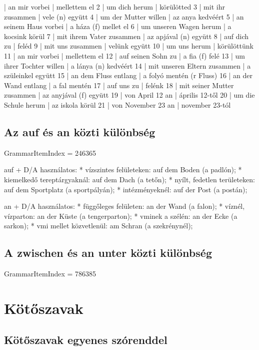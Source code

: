 \documentclass{article}
\newenvironment{desc}{\verbatim}{\endverbatim}
\newenvironment{exmp}{\verbatim}{\endverbatim}
\begin{document}
\begin{exmp}
1 | an mir vorbei | mellettem el
2 | um dich herum | körülötted
3 | mit ihr zusammen | vele (n) együtt
4 | um der Mutter willen | az anya kedvéért
5 | an seinem Haus vorbei | a háza (f) mellet el
6 | um unseren Wagen herum | a kocsink körül
7 | mit ihrem Vater zusammen | az apjával (n) együtt
8 | auf dich zu | feléd
9 | mit uns zusammen | velünk együtt
10 | um uns herum | körülöttünk
11 | an mir vorbei | mellettem el
12 | auf seinen Sohn zu | a fia (f) felé
13 | um ihrer Tochter willen | a lánya (n) kedvéért
14 | mit unseren Eltern zusammen | a szüleinkel együtt
15 | an dem Fluss entlang | a folyó mentén (r Fluss)
16 | an der Wand entlang | a fal mentén
17 | auf uns zu | felénk
18 | mit seiner Mutter zusammen | az anyjával (f) együtt
19 | von April 12 an | április 12-től
20 | um die Schule herum | az iskola körül
21 | von November 23 an | november 23-tól
\end{exmp}

\subsection{Az auf és an közti különbség}

GrammarItemIndex = 246365

\begin{desc}
auf + D/A használatos:
* vízszintes felületeken: auf dem Boden (a padlón);
* kiemelkedő tereptárgyaknál: auf dem Dach (a tetőn);
* nyílt, fedetlen területeken: auf dem Sportplatz (a sportpályán);
* intézményeknél: auf der Post (a postán);

an + D/A használatos:
* függőleges felületen: an der Wand (a falon);
* víznél, vízparton: an der Küste (a tengerparton);
* vminek a szélén: an der Ecke (a sarkon);
* vmi mellet közvetlenül: am Schran (a szekrénynél);
\end{desc}

\subsection{A zwischen és an unter közti különbség}

GrammarItemIndex = 786385

\section{Kötőszavak}

\subsection{Kötőszavak egyenes szórenddel}
\end{document}

